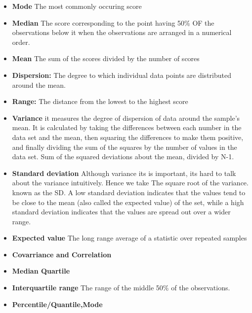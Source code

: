 \documentclass[openany]{book}
\begin{document}
\begin{itemize}
    \item  \textbf{Mode} The most commonly occuring score
   
    \item  \textbf{Median} The score corresponding to the point having 50\% OF the observations below it when the observations are arranged in a numerical order. 
    
    \item \textbf{Mean} The sum of the scores divided by the number of scores
   
    \item \textbf{Dispersion:} The degree to which individual data points are distributed around the mean. 
    
    \item \textbf{Range:} The distance from the lowest to the highest score
    
    \item \textbf{Variance}  it measures the degree of dispersion of data around the sample's mean. It is calculated by taking the differences between each number in the data set and the mean, then squaring the differences to make them positive, and finally dividing the sum of the squares by the number of values in the data set.  Sum of the squared deviations about the mean, divided by N-1. 
    
    \item \textbf{Standard deviation} Although variance its is important, its hard to talk about the variance intuitively. Hence we take The square root of the variance. known as the SD. A low standard deviation indicates that the values tend to be close to the mean (also called the expected value) of the set, while a high standard deviation indicates that the values are spread out over a wider range. 
    
    \item \textbf{Expected value} The long range average of a statistic over repeated samples

    \item \textbf{Covarriance and Correlation}

    \item \textbf{Median Quartile}

    \item \textbf{Interquartile range} The range of the middle 50\% of the observations. 

    \item \textbf{Percentile/Quantile,Mode}


\end{itemize}
\end{document}
